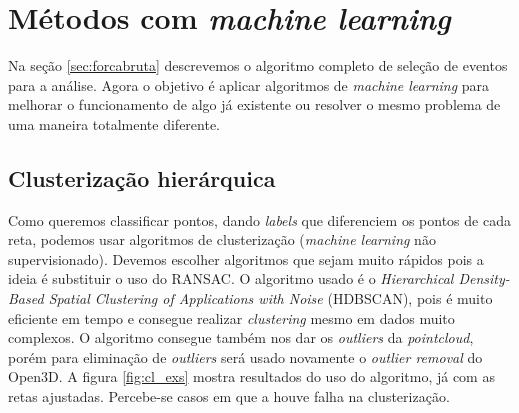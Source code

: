 \documentclass[a4paper,12pt,oneside]{book}
\begin{document}



\section{Métodos com \textit{machine learning}}\label{sec:ml_pc}

\par Na seção \ref{sec:forcabruta} descrevemos o algoritmo completo de seleção de eventos para a análise. Agora o objetivo é aplicar algoritmos de \textit{machine learning} para melhorar o funcionamento de algo já existente ou resolver o mesmo problema de uma maneira totalmente diferente.

\subsection{Clusterização hierárquica}

\par Como queremos classificar pontos, dando \textit{labels} que diferenciem os pontos de cada reta, podemos usar algoritmos de clusterização (\textit{machine learning} não supervisionado). Devemos escolher algoritmos que sejam muito rápidos pois a ideia é substituir o uso do RANSAC. O algoritmo usado é o \textit{Hierarchical Density-Based Spatial Clustering of Applications with Noise} (HDBSCAN)\cite{hdbscan1, hdbscan2}, pois é muito eficiente em tempo e consegue realizar \textit{clustering} mesmo em dados muito complexos. O algoritmo consegue também nos dar os \textit{outliers} da \textit{pointcloud}, porém para eliminação de \textit{outliers} será usado novamente o \textit{outlier removal} do Open3D. A figura \ref{fig:cl_exs} mostra resultados do uso do algoritmo, já com as retas ajustadas. Percebe-se casos em que a houve falha na clusterização.
\end{document}
